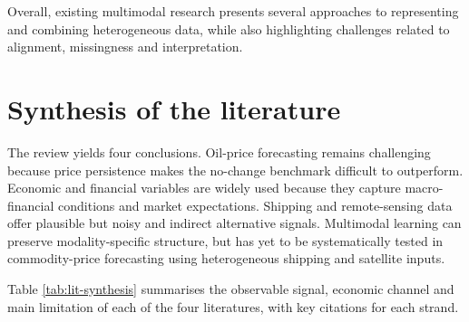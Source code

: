 \documentclass[
  british,
  12pt,
  oneside]{book}
\begin{document}
Overall, existing multimodal research presents several approaches to representing and combining heterogeneous data, while also highlighting challenges related to alignment, missingness and interpretation.

\section{Synthesis of the literature}\label{lit-synthesis}

The review yields four conclusions. Oil-price forecasting remains challenging because price persistence makes the no-change benchmark difficult to outperform. Economic and financial variables are widely used because they capture macro-financial conditions and market expectations. Shipping and remote-sensing data offer plausible but noisy and indirect alternative signals. Multimodal learning can preserve modality-specific structure, but has yet to be systematically tested in commodity-price forecasting using heterogeneous shipping and satellite inputs.

Table \ref{tab:lit-synthesis} summarises the observable signal, economic channel and main limitation of each of the four literatures, with key citations for each strand.
\end{document}
